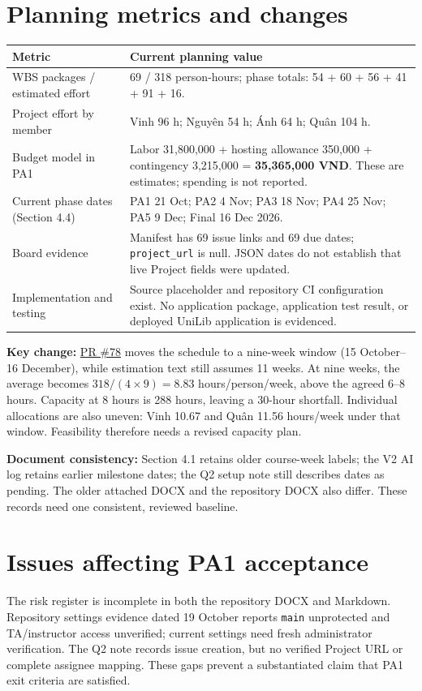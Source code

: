 \documentclass[11pt,a4paper]{article}
\newcommand{\pr}[1]{\href{https://github.com/Vincenthevinh/UniLib/pull/#1}{PR \##1}}
\begin{document}
\section{Planning metrics and changes}
{\small
\begin{tabularx}{\textwidth}{@{}P{53mm}Y@{}}
\toprule
{}\textbf{Metric} & \textbf{Current planning value} \\
\midrule
WBS packages / estimated effort & 69 / 318 person-hours; phase totals: 54 + 60 + 56 + 41 + 91 + 16. \\
Project effort by member & Vinh 96 h; Nguyên 54 h; Ánh 64 h; Quân 104 h. \\
Budget model in PA1 & Labor 31,800,000 + hosting allowance 350,000 + contingency 3,215,000 = \textbf{35,365,000 VND}. These are estimates; spending is not reported. \\
Current phase dates (Section 4.4) & PA1 21 Oct; PA2 4 Nov; PA3 18 Nov; PA4 25 Nov; PA5 9 Dec; Final 16 Dec 2026. \\
Board evidence & Manifest has 69 issue links and 69 due dates; \texttt{project\_url} is null. JSON dates do not establish that live Project fields were updated. \\
Implementation and testing & Source placeholder and repository CI configuration exist. No application package, application test result, or deployed UniLib application is evidenced. \\
\bottomrule
\end{tabularx}}

\textbf{Key change:} \pr{78} moves the schedule to a nine-week window (15 October--16 December), while estimation text still assumes 11 weeks. At nine weeks, the average becomes $318/(4\times9)=8.83$ hours/person/week, above the agreed 6--8 hours. Capacity at 8 hours is 288 hours, leaving a 30-hour shortfall. Individual allocations are also uneven: Vinh 10.67 and Quân 11.56 hours/week under that window. Feasibility therefore needs a revised capacity plan.

\textbf{Document consistency:} Section 4.1 retains older course-week labels; the V2 AI log retains earlier milestone dates; the Q2 setup note still describes dates as pending. The older attached DOCX and the repository DOCX also differ. These records need one consistent, reviewed baseline.

\section{Issues affecting PA1 acceptance}
The risk register is incomplete in both the repository DOCX and Markdown. Repository settings evidence dated 19 October reports \texttt{main} unprotected and TA/instructor access unverified; current settings need fresh administrator verification. The Q2 note records issue creation, but no verified Project URL or complete assignee mapping. These gaps prevent a substantiated claim that PA1 exit criteria are satisfied.
\end{document}

